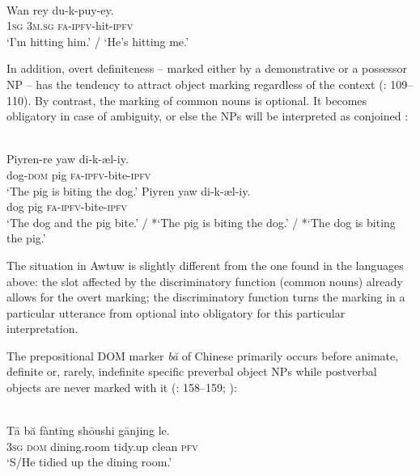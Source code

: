 \documentclass[output=paper]{langsci/langscibook}
\begin{document}
\ea\label{ex:serzant:18}
\\
\gll *Wan   rey   du-k-puy-ey.\\
     \textsc{1sg}   \textsc{3m.sg}  \textsc{fa-ipfv}{}-hit-\textsc{ipfv}\\
 ‘I’m hitting him.’ / ‘He’s hitting me.’
\z

In addition, overt definiteness – marked either by a demonstrative or a possessor NP – has the tendency to attract object marking regardless of the context (\citealt{Feldman1986}: 109\-–110). By contrast, the marking of common nouns is optional. It becomes obligatory in case of ambiguity, or else the NPs will be interpreted as conjoined \citep[110]{Feldman1986}:

\ea\label{ex:serzant:19}
\\
\ea
\gll Piyren-re  yaw  di-k-æl-iy.\\
     dog-\textsc{dom}  pig  \textsc{fa-ipfv}{}-bite-\textsc{ipfv}\\
\glt ‘The pig is biting the dog.’
\ex
\gll Piyren  yaw  di-k-æl-iy.\\
     dog  pig  \textsc{fa-ipfv}{}-bite-\textsc{ipfv}\\
\glt ‘The dog and the pig bite.’ / *‘The pig is biting the dog.’ / *‘The dog is biting the pig.’
\z
\z

The situation in Awtuw is slightly different from the one found in the languages above: the slot affected by the discriminatory function (common nouns) already allows for the overt marking; the discriminatory function turns the marking in a particular utterance from optional into obligatory for this particular interpretation.

The prepositional DOM marker \textit{bă} of Chinese primarily occurs before animate, definite or, rarely, indefinite specific preverbal object NPs while postverbal objects are never marked with it (\citealt{LiThompson1981,Bisang1992}: 158–159; \citealt{YangvanBergen2007}):

\ea \label{ex:serzant:20}
\\
\gll Tā   bă   fàntīng   shōushi   gānjing le.\\
     \textsc{3sg}  \textsc{dom}  dining.room   tidy.up   clean   \textsc{pfv}\\
\glt ‘S/He tidied up the dining room.’
\z
\end{document}
